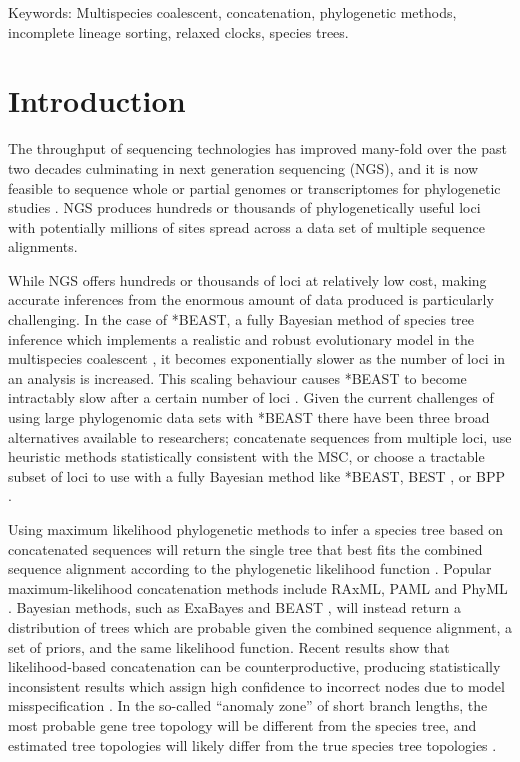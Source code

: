 \documentclass[12pt]{article}
\begin{document}
Keywords: Multispecies coalescent, concatenation, phylogenetic methods, incomplete lineage sorting, relaxed clocks, species trees.

\section{Introduction}

The throughput of sequencing technologies has improved many-fold over the past
two decades culminating in next generation sequencing (NGS), and it is now
feasible to sequence whole or partial genomes or transcriptomes for phylogenetic
studies \citep{annurev-ecolsys-110512-135822}. NGS produces hundreds or
thousands of phylogenetically useful loci \citep[see for example][]{Blom20160181}
with potentially millions of sites spread across a data set of multiple
sequence alignments.

While NGS offers hundreds or thousands of loci at relatively low cost, making
accurate inferences from the enormous amount of data produced is particularly
challenging. In the case of *BEAST, a fully Bayesian method of species tree
inference which implements a realistic and robust evolutionary model in the
multispecies coalescent \citep[MSC;][]{Degnan2009332, Heled01032010}, it becomes exponentially
slower as the number of loci in an analysis is increased. This scaling behaviour
causes *BEAST to become intractably slow after a certain number of loci
\citep[the exact number will depend on other parameters of the data set, see][]{Ogilvie01052016}.
Given the current challenges of using large phylogenomic data sets with *BEAST
there have been three broad alternatives available to researchers; concatenate
sequences from multiple loci, use heuristic methods statistically consistent with the MSC, or choose a tractable
subset of loci to use with a fully Bayesian method like *BEAST, BEST \citep{Liu01112008}, or BPP
\citep{Yang854}.

Using maximum likelihood phylogenetic methods to infer a species tree based on concatenated
sequences will return the single tree that
best fits the combined sequence alignment according to the phylogenetic likelihood function \citep{Felsenstein1981}. Popular maximum-likelihood concatenation methods include
RAxML, PAML and PhyML \citep{Stamatakis01052014,
Yang01082007,Guindon01052010}. Bayesian methods, such as ExaBayes and BEAST
\citep{Aberer01102014, Drummond2007}, will instead return a distribution of trees which are probable
given the combined sequence alignment, a set of priors, and the same likelihood function.
Recent results show that likelihood-based concatenation
can be counterproductive, producing statistically inconsistent results which assign
high confidence to incorrect nodes due to model misspecification
\citep{NYAS:NYAS12747}. In the so-called ``anomaly zone'' of short branch
lengths, the most probable gene tree topology will be different from the species
tree, and estimated tree topologies will likely differ from the true species
tree topologies \citep{journal.pgen.0020068, Kubatko01022007}.
\end{document}
